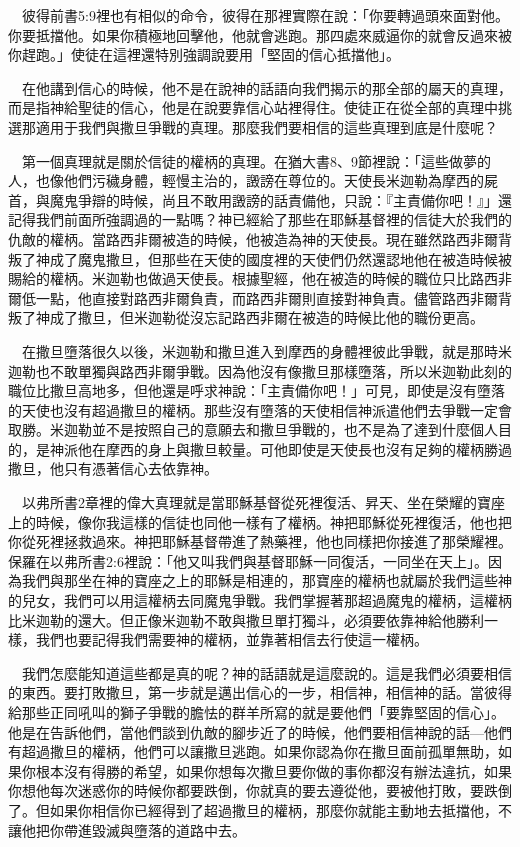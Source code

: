 \documentclass{book}
\begin{document}
　彼得前書5:9裡也有相似的命令，彼得在那裡實際在說：「你要轉過頭來面對他。你要抵擋他。如果你積極地回擊他，他就會逃跑。那四處來威逼你的就會反過來被你趕跑。」使徒在這裡還特別強調說要用「堅固的信心抵擋他」。

　在他講到信心的時候，他不是在說神的話語向我們揭示的那全部的屬天的真理，而是指神給聖徒的信心，他是在說要靠信心站裡得住。使徒正在從全部的真理中挑選那適用于我們與撒旦爭戰的真理。那麼我們要相信的這些真理到底是什麼呢？

　第一個真理就是關於信徒的權柄的真理。在猶大書8、9節裡說：「這些做夢的人，也像他們污穢身體，輕慢主治的，譭謗在尊位的。天使長米迦勒為摩西的屍首，與魔鬼爭辯的時候，尚且不敢用譭謗的話責備他，只說：『主責備你吧！』」還記得我們前面所強調過的一點嗎？神已經給了那些在耶穌基督裡的信徒大於我們的仇敵的權柄。當路西非爾被造的時候，他被造為神的天使長。現在雖然路西非爾背叛了神成了魔鬼撒旦，但那些在天使的國度裡的天使們仍然還認地他在被造時候被賜給的權柄。米迦勒也做過天使長。根據聖經，他在被造的時候的職位只比路西非爾低一點，他直接對路西非爾負責，而路西非爾則直接對神負責。儘管路西非爾背叛了神成了撒旦，但米迦勒從沒忘記路西非爾在被造的時候比他的職份更高。

　在撒旦墮落很久以後，米迦勒和撒旦進入到摩西的身體裡彼此爭戰，就是那時米迦勒也不敢單獨與路西非爾爭戰。因為他沒有像撒旦那樣墮落，所以米迦勒此刻的職位比撒旦高地多，但他還是呼求神說：「主責備你吧！」可見，即使是沒有墮落的天使也沒有超過撒旦的權柄。那些沒有墮落的天使相信神派遣他們去爭戰一定會取勝。米迦勒並不是按照自己的意願去和撒旦爭戰的，也不是為了達到什麼個人目的，是神派他在摩西的身上與撒旦較量。可他即使是天使長也沒有足夠的權柄勝過撒旦，他只有憑著信心去依靠神。

　以弗所書2章裡的偉大真理就是當耶穌基督從死裡復活、昇天、坐在榮耀的寶座上的時候，像你我這樣的信徒也同他一樣有了權柄。神把耶穌從死裡復活，他也把你從死裡拯救過來。神把耶穌基督帶進了熱藥裡，他也同樣把你接進了那榮耀裡。保羅在以弗所書2:6裡說：「他又叫我們與基督耶穌一同復活，一同坐在天上」。因為我們與那坐在神的寶座之上的耶穌是相連的，那寶座的權柄也就屬於我們這些神的兒女，我們可以用這權柄去同魔鬼爭戰。我們掌握著那超過魔鬼的權柄，這權柄比米迦勒的還大。但正像米迦勒不敢與撒旦單打獨斗，必須要依靠神給他勝利一樣，我們也要記得我們需要神的權柄，並靠著相信去行使這一權柄。

　我們怎麼能知道這些都是真的呢？神的話語就是這麼說的。這是我們必須要相信的東西。要打敗撒旦，第一步就是邁出信心的一步，相信神，相信神的話。當彼得給那些正同吼叫的獅子爭戰的膽怯的群羊所寫的就是要他們「要靠堅固的信心」。他是在告訴他們，當他們談到仇敵的腳步近了的時候，他們要相信神說的話---他們有超過撒旦的權柄，他們可以讓撒旦逃跑。如果你認為你在撒旦面前孤單無助，如果你根本沒有得勝的希望，如果你想每次撒旦要你做的事你都沒有辦法違抗，如果你想他每次迷惑你的時候你都要跌倒，你就真的要去遵從他，要被他打敗，要跌倒了。但如果你相信你已經得到了超過撒旦的權柄，那麼你就能主動地去抵擋他，不讓他把你帶進毀滅與墮落的道路中去。
\end{document}
